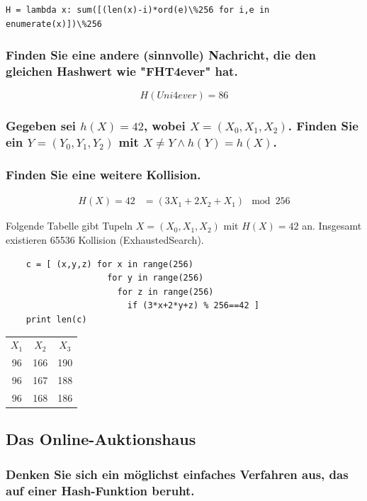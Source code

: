 \begin{lstlisting}
H = lambda x: sum([(len(x)-i)*ord(e)\%256 for i,e in enumerate(x)])\%256
\end{lstlisting}

\subsubsection{Finden Sie eine andere (sinnvolle) Nachricht, die den gleichen Hashwert wie "FHT4ever" hat.}

\[  H(Uni4ever) = 86 \]

\subsubsection{Gegeben sei $h(X)=42$, wobei $X = (X_0,X_1,X_2)$. Finden Sie ein $Y =(Y_0,Y_1,Y_2)$ mit $X ≠ Y \wedge
h(Y) = h(X)$.}
\subsubsection{Finden Sie eine weitere Kollision.}


\begin{align}
	H(X) = 42 &= (3 X_1 + 2 X_2 + X_1) \mod 256 	        
\end{align}


Folgende Tabelle gibt Tupeln   $X = (X_0,X_1,X_2)$ mit  $H(X) = 42$ an. 
Insgesamt existieren 65536 Kollision (ExhaustedSearch).
\begin{lstlisting}
	c = [ (x,y,z) for x in range(256) 
                    for y in range(256) 
                      for z in range(256)
                        if (3*x+2*y+z) % 256==42 ]
	print len(c)
\end{lstlisting}
\begin{center}
\begin{tabular}{ccc}
$X_1$&$X_2$&$X_3$\\
96 & 166 & 190 \\
96 & 167 & 188 \\
96 & 168 & 186 
\end{tabular}
\end{center}



\subsection{Das Online-Auktionshaus}

\subsubsection{Denken Sie sich ein möglichst einfaches Verfahren aus, das auf einer Hash-Funktion beruht.}

